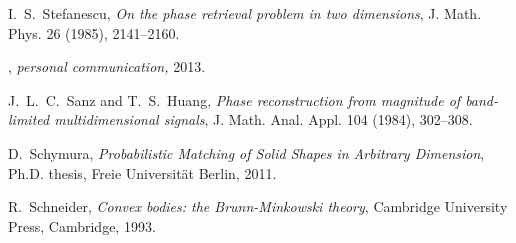 \documentclass[a4paper]{amsart}
\theoremstyle{definition}
\numberwithin{equation}{section}
\begin{document}
\begin{thebibliography}{Bia09a}
  I.~S.~Stefanescu, \emph{On the phase retrieval problem in two dimensions}, J. Math. Phys. 26 (1985), 2141--2160.

 \bysame, \emph{personal communication,} 2013.

 J.~L.~C.~Sanz and T.~S.~Huang, \emph{Phase reconstruction from magnitude of band-limited multidimensional signals}, J. Math. Anal. Appl. 104 (1984), 302--308.

D.~Schymura, \emph{Probabilistic Matching of Solid Shapes in Arbitrary Dimension}, Ph.D. thesis, Freie Universit{\"a}t Berlin, 2011.

R.~Schneider, \emph{Convex bodies: the Brunn-Minkowski theory}, Cambridge University Press, Cambridge, 1993.

\end{thebibliography}
\end{document}
